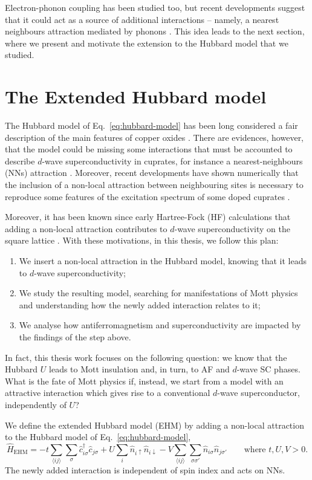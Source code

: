 Electron-phonon coupling has been studied too, but recent developments suggest that it could act as a source of additional interactions -- namely, a nearest neighbours attraction mediated by phonons \cite{jiang2022enhancing}. This idea leads to the next section, where we present and motivate the extension to the Hubbard model that we studied.

\section{The Extended Hubbard model}\label{subsec:ehm}

The Hubbard model of Eq.~\eqref{eq:hubbard-model} has been long considered a fair description of the main features of copper oxides \cite{scalapino2012common}. There are evidences, however, that the model could be missing some interactions that must be accounted to describe $d$-wave superconductivity in cuprates, for instance a nearest-neighbours (NNs) attraction \cite{jiang2022enhancing}. Moreover, recent developments have shown numerically that the inclusion of a non-local attraction between neighbouring sites is necessary to reproduce some features of the excitation spectrum of some doped cuprates \cite{padma2025beyond}.

Moreover, it has been known since early Hartree-Fock (HF) calculations that adding a non-local attraction contributes to $d$-wave superconductivity on the square lattice \cite{micnas1990superconductivity}. With these motivations, in this thesis, we follow this plan:
\begin{enumerate}
	\item We insert a non-local attraction in the Hubbard model, knowing that it leads to $d$-wave superconductivity;
	\item We study the resulting model, searching for manifestations of Mott physics and understanding how the newly added interaction relates to it;
	\item We analyse how antiferromagnetism and superconductivity are impacted by the findings of the step above.
\end{enumerate}
In fact, this thesis work focuses on the following question: we know that the Hubbard $U$ leads to Mott insulation and, in turn, to AF and $d$-wave SC phases. What is the fate of Mott physics if, instead, we start from a model with an attractive interaction which gives rise to a conventional $d$-wave superconductor, independently of $U$?

We define the extended Hubbard model (EHM) by adding a non-local attraction to the Hubbard model of Eq.~\eqref{eq:hubbard-model},
\begin{equation}\label{eq:extended-hubbard-model}
	\hat H_\mathrm{EHM} =
	-t \sum_{\langle ij \rangle} \sum_\sigma \hat c_{i\sigma}^\dagger \hat c_{j\sigma}
	+ U \sum_i \hat n_{i\uparrow} \hat n_{i\downarrow}
	- V \sum_{\langle ij \rangle} \sum_{\sigma \sigma'} \hat n_{i\sigma} \hat n_{j\sigma'}
	\qquad
	\text{where $t, U, V > 0$.}
\end{equation}
The newly added interaction is independent of spin index and acts on NNs. 


